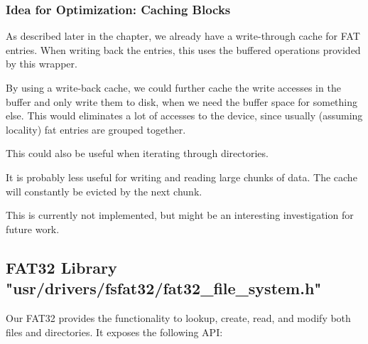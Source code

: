 \subsubsection{Idea for Optimization: Caching Blocks}
As described later in the chapter, we already have a write-through cache for FAT entries.
When writing back the entries, this uses the buffered operations provided by this wrapper.

By using a write-back cache, we could further cache the write accesses in the buffer and only write them to disk, when we need the buffer space for something else.
This would eliminates a lot of accesses to the device, since usually (assuming locality) fat entries are grouped together.

This could also be useful when iterating through directories.

It is probably less useful for writing and reading large chunks of data. The
cache will constantly be evicted by the next chunk.

This is currently not implemented, but might be an interesting investigation for
future work.

\subsection{FAT32 Library "usr/drivers/fsfat32/fat32\_file\_system.h"}

Our FAT32 provides the functionality to lookup, create, read, and modify both files and directories.
It exposes the following API:

